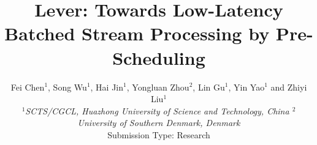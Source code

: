 \documentclass[10pt,conference,compsocconf,letterpaper]{IEEEtran}
\begin{document}
%
\title{Lever: Towards Low-Latency Batched Stream Processing by Pre-Scheduling}




\author{Fei Chen$^1$, Song Wu$^1$, Hai Jin$^1$, Yongluan Zhou$^2$, Lin Gu$^1$, Yin Yao$^1$ and Zhiyi Liu$^1$ \\
\small{\em $^1$SCTS/CGCL, Huazhong University of Science and Technology, China \quad
           $^2$University of Southern Denmark, Denmark} \\ [2mm]
\small Submission Type: Research
}
\date{}


%
\end{document}
